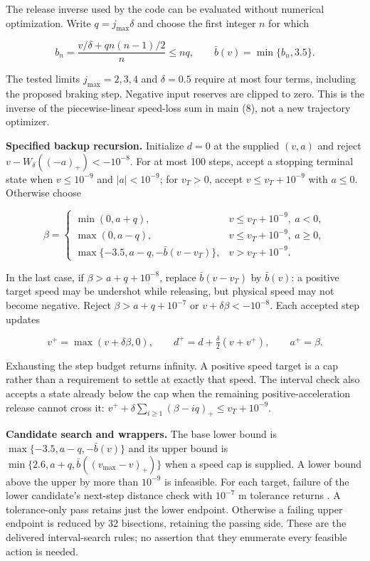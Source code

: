 \documentclass[letterpaper,journal,onecolumn]{IEEEtran}
\begin{document}
The release inverse used by the code can be evaluated without numerical optimization. Write \(q=j_{\max}\delta\) and choose the first integer \(n\) for which

\[b_n=\frac{v/\delta+q n(n-1)/2}{n}\le nq,
\qquad \bar b(v)=\min\{b_n,3.5\}.\tag{D1}\]

The tested limits \(j_{\max}=2,3,4\) and \(\delta=0.5\) require at most four terms, including the proposed braking step. Negative input reserves are clipped to zero. This is the inverse of the piecewise-linear speed-loss sum in main (8), not a new trajectory optimizer.

\textbf{Specified backup recursion.} Initialize \(d=0\) at the supplied \((v,a)\) and reject \(v-W_\delta((-a)_+)<-10^{-8}\). For at most 100 steps, accept a stopping terminal state when \(v\le10^{-9}\) and \(|a|<10^{-9}\); for \(v_T>0\), accept \(v\le v_T+10^{-9}\) with \(a\le0\). Otherwise choose

\[\beta=\begin{cases}
\min(0,a+q),&v\le v_T+10^{-9},\ a<0,\\
\max(0,a-q),&v\le v_T+10^{-9},\ a\ge0,\\
\max\{-3.5,a-q,-\bar b(v-v_T)\},&v>v_T+10^{-9}.
\end{cases}\tag{D2}\]

In the last case, if \(\beta>a+q+10^{-8}\), replace \(\bar b(v-v_T)\) by \(\bar b(v)\): a positive target speed may be undershot while releasing, but physical speed may not become negative. Reject \(\beta>a+q+10^{-7}\) or \(v+\delta\beta<-10^{-8}\). Each accepted step updates

\[v^+=\max(v+\delta\beta,0),\qquad
d^+=d+\tfrac\delta2(v+v^+),\qquad a^+=\beta.\tag{D3}\]

Exhausting the step budget returns infinity. A positive speed target is a cap rather than a requirement to settle at exactly that speed. The interval check also accepts a state already below the cap when the remaining positive-acceleration release cannot cross it: \(v^++\delta\sum_{i\ge1}(\beta-iq)_+\le v_T+10^{-9}\).

\textbf{Candidate search and wrappers.} The base lower bound is \(\max\{-3.5,a-q,-\bar b(v)\}\) and its upper bound is \(\min\{2.6,a+q,\bar b((v_{\max}-v)_+)\}\) when a speed cap is supplied. A lower bound above the upper by more than \(10^{-9}\) is infeasible. For each target, failure of the lower candidate's next-step distance check with \(10^{-7}\) m tolerance returns . A tolerance-only pass retains just the lower endpoint. Otherwise a failing upper endpoint is reduced by 32 bisections, retaining the passing side. These are the delivered interval-search rules; no assertion that they enumerate every feasible action is needed.
\end{document}
